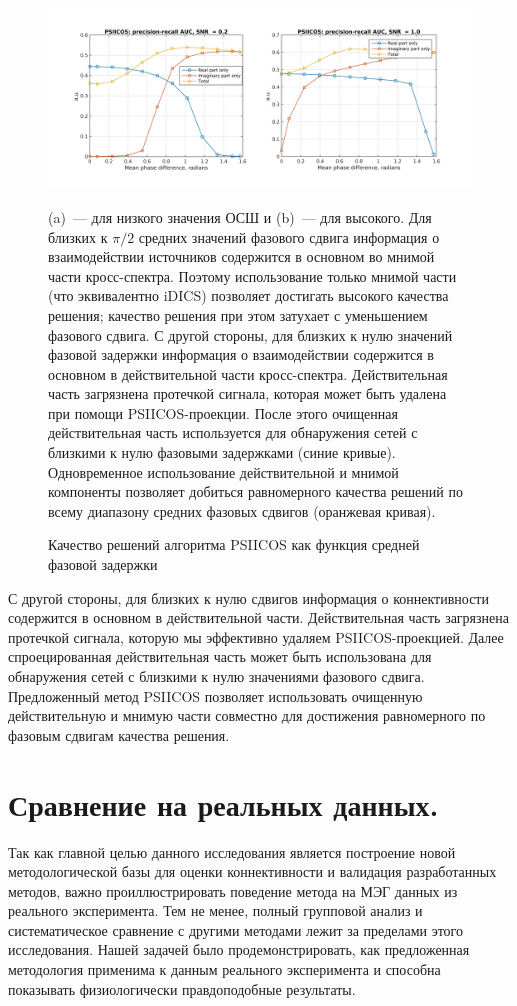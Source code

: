 \begin{figure}[!ht]
 \includegraphics[width=1\textwidth]{../images/psiicos_paper/Figure9_hr.jpg}
 \caption{Качество решений алгоритма PSIICOS как функция средней фазовой задержки}\label{fig:09}
     (a)~--- для низкого значения ОСШ и (b)~--- для высокого.
     Для близких к $\pi/2$ средних значений фазового сдвига информация
     о взаимодействии источников содержится в основном во мнимой части кросс-спектра.
     Поэтому использование только мнимой части (что эквивалентно iDICS) позволяет
     достигать высокого качества решения; качество решения при этом затухает
     с уменьшением фазового сдвига. С другой стороны, для близких к нулю
     значений фазовой задержки информация о взаимодействии содержится в основном
     в действительной части кросс-спектра. Действительная часть загрязнена
     протечкой сигнала, которая может быть удалена при помощи PSIICOS-проекции.
     После этого очищенная действительная часть используется для обнаружения
     сетей с близкими к нулю фазовыми задержками (синие кривые). Одновременное
     использование действительной и мнимой компоненты позволяет добиться равномерного
     качества решений по всему диапазону средних фазовых сдвигов (оранжевая кривая).
\end{figure}%

С другой стороны, для близких к нулю сдвигов информация о коннективности содержится
в основном в действительной части. Действительная часть загрязнена протечкой сигнала, которую
мы эффективно удаляем PSIICOS-проекцией. Далее спроецированная действительная часть
может быть использована для обнаружения сетей с близкими к нулю значениями фазового
сдвига. Предложенный метод PSIICOS позволяет использовать очищенную действительную
и мнимую части совместно для достижения равномерного по фазовым сдвигам качества решения.

\section{Сравнение на реальных данных.}\label{sec:validation_on_real_data}
Так как главной целью данного
исследования является построение новой методологической базы для оценки
коннективности и валидация разработанных методов, важно
проиллюстрировать поведение метода на МЭГ данных из реального эксперимента.
Тем не менее, полный групповой анализ и систематическое сравнение с другими
методами лежит за пределами этого исследования. Нашей задачей было продемонстрировать,
как предложенная методология применима к данным реального эксперимента и способна показывать
физиологически правдоподобные результаты.

